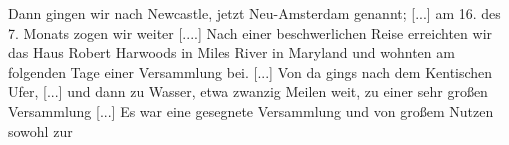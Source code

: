 Dann gingen wir nach Newcastle, jetzt Neu-Amsterdam
genannt; [...] am 16. des 7. Monats zogen wir weiter [....]
Nach einer beschwerlichen Reise erreichten wir das Haus Robert
Harwoods in Miles River 
in Maryland und wohnten am
folgenden Tage einer Versammlung bei. [...] Von da gings
nach dem Kentischen Ufer, [...] und dann zu Wasser, etwa zwanzig
Meilen weit, zu einer sehr großen Versammlung [...] Es war
eine gesegnete Versammlung und von großem Nutzen sowohl zur